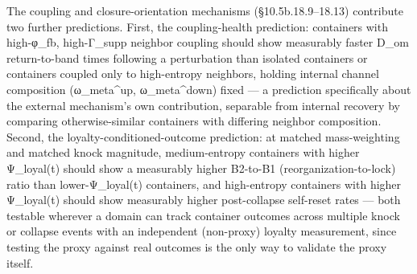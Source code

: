\documentclass[
]{article}
\begin{document}
The coupling and closure-orientation mechanisms (§10.5b.18.9--18.13)
contribute two further predictions. First, the coupling-health
prediction: containers with high-φ\_fb, high-Γ\_supp neighbor coupling
should show measurably faster D\_om return-to-band times following a
perturbation than isolated containers or containers coupled only to
high-entropy neighbors, holding internal channel composition
(ω\_meta\^{}up, ω\_meta\^{}down) fixed --- a prediction specifically
about the external mechanism's own contribution, separable from internal
recovery by comparing otherwise-similar containers with differing
neighbor composition. Second, the loyalty-conditioned-outcome
prediction: at matched mass-weighting and matched knock magnitude,
medium-entropy containers with higher Ψ\_loyal(t) should show a
measurably higher B2-to-B1 (reorganization-to-lock) ratio than
lower-Ψ\_loyal(t) containers, and high-entropy containers with higher
Ψ\_loyal(t) should show measurably higher post-collapse self-reset rates
--- both testable wherever a domain can track container outcomes across
multiple knock or collapse events with an independent (non-proxy)
loyalty measurement, since testing the proxy against real outcomes is
the only way to validate the proxy itself.
\end{document}
